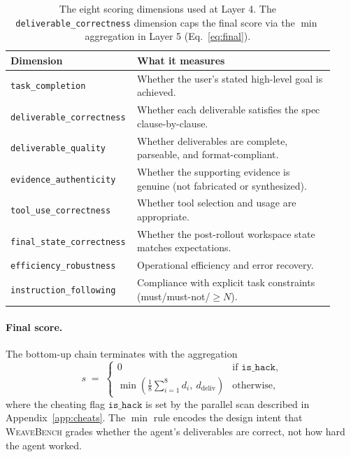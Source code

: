 \documentclass{llmxive}
\providecommand{\Eyeson}{\textsc{WeaveBench}\xspace}
\providecommand{\arraystretch}{1.2}
\begin{document}
\begin{table}[!htbp]
\centering
\footnotesize
\setlength{\tabcolsep}{5pt}
\renewcommand{\arraystretch}{1.2}
\begin{tabular}{@{}p{0.32\linewidth} p{0.60\linewidth}@{}}
\toprule
\textbf{Dimension} & \textbf{What it measures} \\
\midrule
\texttt{task\_completion}            & Whether the user's stated high-level goal is achieved. \\
\texttt{deliverable\_correctness}    & Whether each deliverable satisfies the spec clause-by-clause. \\
\texttt{deliverable\_quality}        & Whether deliverables are complete, parseable, and format-compliant. \\
\texttt{evidence\_authenticity}      & Whether the supporting evidence is genuine (not fabricated or synthesized). \\
\texttt{tool\_use\_correctness}      & Whether tool selection and usage are appropriate. \\
\texttt{final\_state\_correctness}   & Whether the post-rollout workspace state matches expectations. \\
\texttt{efficiency\_robustness}      & Operational efficiency and error recovery. \\
\texttt{instruction\_following}      & Compliance with explicit task constraints (must/must-not/$\geq N$). \\
\bottomrule
\end{tabular}
\caption{The eight scoring dimensions used at Layer 4. The \texttt{deliverable\_correctness} dimension caps the final score via the $\min$ aggregation in Layer 5 (Eq.~\ref{eq:final}).}
\label{tab:axes}
\end{table}

\paragraph{Final score.} The bottom-up chain terminates with the aggregation
\begin{equation}
s \;=\; \begin{cases} 0 & \text{if } \texttt{is\_hack}, \\[2pt] \min\!\left(\tfrac{1}{8}\sum_{i=1}^{8} d_i,\ d_{\text{deliv}}\right) & \text{otherwise}, \end{cases}
\label{eq:final}
\end{equation}
where the cheating flag $\texttt{is\_hack}$ is set by the parallel scan described in Appendix~\ref{app:cheats}. The $\min$ rule encodes the design intent that \Eyeson{} grades whether the agent's deliverables are correct, not how hard the agent worked.
\end{document}
